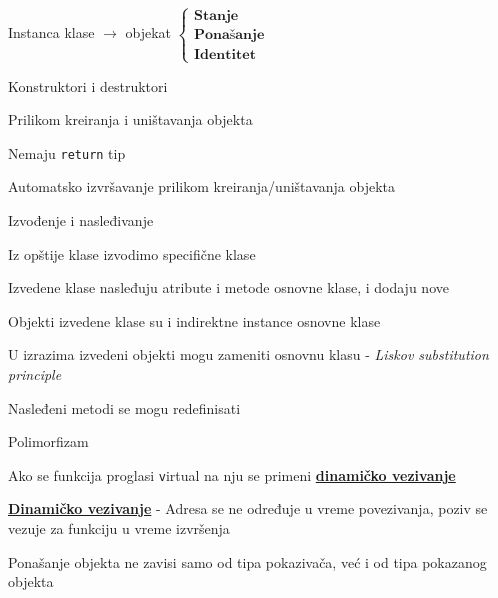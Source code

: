 \documentclass{article}
\newenvironment{xitemize}{%
    
    \itemize
    \larger
}{%
    \enditemize
}
\let\olditemize\itemize
\let\endolditemize\enditemize
\renewenvironment{itemize}{%
    \smaller
    \olditemize
}{%
    \endolditemize
}
\providecommand{\inlinecode}[1]{\texttt{#1}}
\begin{document}
\begin{xitemize}
\begin{itemize}
        \item Instanca klase $\rightarrow$ objekat $\begin{cases}
        \textbf{Stanje}\\
        \textbf{Ponašanje}\\
        \textbf{Identitet}
        \end{cases}$
    \end{itemize}
    \item Konstruktori i destruktori
    \begin{itemize}
        \item Prilikom kreiranja i uništavanja objekta
        \item Nemaju \inlinecode{return} tip
        \item Automatsko izvršavanje prilikom kreiranja/uništavanja objekta
    \end{itemize}
    \item Izvođenje i nasleđivanje
    \begin{itemize}
        \item Iz opštije klase izvodimo specifične klase
        \item Izvedene klase nasleđuju atribute i metode osnovne klase, i dodaju nove
        \item Objekti izvedene klase su i indirektne instance osnovne klase
        \item U izrazima izvedeni objekti mogu zameniti osnovnu klasu - \textit{Liskov substitution principle}
        \item Nasleđeni metodi se mogu redefinisati
    \end{itemize}
    \item Polimorfizam
    \begin{itemize}
        \item Ako se funkcija proglasi \inlinecode virtual na nju se primeni \textbf{\underline{dinamičko vezivanje}}
        \item \textbf{\underline{Dinamičko vezivanje}} - Adresa se ne određuje u vreme povezivanja, poziv se vezuje za funkciju u vreme izvršenja
        \item Ponašanje objekta ne zavisi samo od tipa pokazivača, već i od tipa pokazanog objekta
    \end{itemize}
    

\end{xitemize}
\end{document}
